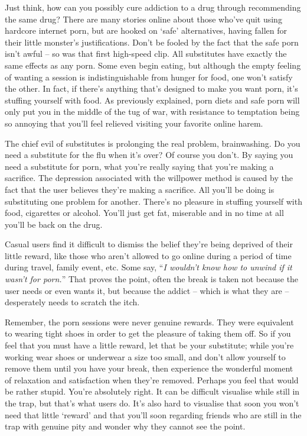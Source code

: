 \documentclass[
]{book}
\begin{document}
Just think, how can you possibly cure addiction to a drug through recommending the same drug? There are many stories online about those who've quit using hardcore internet porn, but are hooked on `safe' alternatives, having fallen for their little monster's justifications. Don't be fooled by the fact that the safe porn isn't awful -- so was that first high-speed clip. All substitutes have exactly the same effects as any porn. Some even begin eating, but although the empty feeling of wanting a session is indistinguishable from hunger for food, one won't satisfy the other. In fact, if there's anything that's designed to make you want porn, it's stuffing yourself with food. As previously explained, porn diets and safe porn will only put you in the middle of the tug of war, with resistance to temptation being so annoying that you'll feel relieved visiting your favorite online harem.

The chief evil of substitutes is prolonging the real problem, brainwashing. Do you need a substitute for the flu when it's over? Of course you don't. By saying you need a substitute for porn, what you're really saying that you're making a sacrifice. The depression associated with the willpower method is caused by the fact that the user believes they're making a sacrifice. All you'll be doing is substituting one problem for another. There's no pleasure in stuffing yourself with food, cigarettes or alcohol. You'll just get fat, miserable and in no time at all you'll be back on the drug.

Casual users find it difficult to dismiss the belief they're being deprived of their little reward, like those who aren't allowed to go online during a period of time during travel, family event, etc. Some say, ``\emph{I wouldn't know how to unwind if it wasn't for porn.}'' That proves the point, often the break is taken not because the user needs or even wants it, but because the addict -- which is what they are -- desperately needs to scratch the itch.

Remember, the porn sessions were never genuine rewards. They were equivalent to wearing tight shoes in order to get the pleasure of taking them off. So if you feel that you must have a little reward, let that be your substitute; while you're working wear shoes or underwear a size too small, and don't allow yourself to remove them until you have your break, then experience the wonderful moment of relaxation and satisfaction when they're removed. Perhaps you feel that would be rather stupid. You're absolutely right. It can be difficult visualise while still in the trap, but that's what users do. It's also hard to visualise that soon you won't need that little `reward' and that you'll soon regarding friends who are still in the trap with genuine pity and wonder why they cannot see the point.
\end{document}
